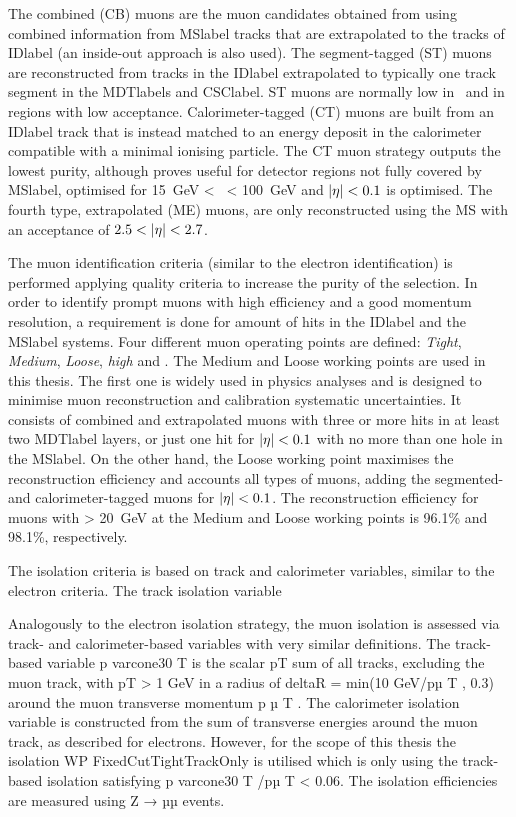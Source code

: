The combined (CB) muons are the muon candidates obtained from using combined information from \acrshort{MSlabel} tracks that are extrapolated to the tracks of \acrshort{IDlabel} (an inside-out approach is also used). The segment-tagged (ST) muons are reconstructed from tracks in the \acrshort{IDlabel} extrapolated to typically one track segment in the \acrshort{MDTlabel}s and \acrshort{CSClabel}. ST muons are normally low in \pT\ and in regions with low acceptance. Calorimeter-tagged (CT) muons are built from an \acrshort{IDlabel} track that is instead matched to an energy deposit in the calorimeter compatible with a minimal ionising particle. The CT muon strategy outputs the lowest purity, although proves useful for detector regions not fully covered by \acrshort{MSlabel}, optimised for 15~GeV < \pT\ < 100~GeV and $\abs{\eta}<0.1$ is optimised. The fourth type, extrapolated (ME) muons, are only reconstructed using the \acrshort{MS} with an acceptance of $2.5 < \abs{\eta} < 2.7$.

The muon identification criteria (similar to the electron identification) is performed applying quality criteria to increase the purity of the selection. In order to identify prompt muons with high efficiency and a
good momentum resolution, a requirement is done for amount of hits in the \acrshort{IDlabel} and the \acrshort{MSlabel} systems. Four different muon operating points are defined: \textit{Tight}, \textit{Medium}, \textit{Loose}, \textit{high \pT} and . The Medium and Loose working points are used in this thesis. The first one is widely used in physics analyses and is designed to minimise muon reconstruction and calibration systematic uncertainties. It consists of combined and extrapolated muons with three or more hits in at least two \acrshort{MDTlabel} layers, or just one hit for $\abs{\eta}<0.1$ with no more than one hole in the \acrshort{MSlabel}. On the other hand, the Loose working point maximises the reconstruction efficiency and accounts all types of muons, adding the segmented- and calorimeter-tagged muons for $\abs{\eta}<0.1$. The reconstruction efficiency for muons with \pT > 20~GeV at the Medium and Loose working points is 96.1\% and 98.1\%, respectively.

The isolation criteria is based on track and calorimeter variables, similar to the electron criteria. The track isolation variable

Analogously to the electron isolation strategy, the muon isolation is assessed via track- and calorimeter-based variables with very similar definitions. The track-based variable p
varcone30
T
is the scalar pT sum
of all tracks, excluding the muon track, with pT > 1 GeV in a radius of deltaR = min(10 GeV/pµ
T
, 0.3)
around the muon transverse momentum p
µ
T
. The calorimeter isolation variable is constructed from
the sum of transverse energies around the muon track, as described for electrons. However, for the
scope of this thesis the isolation WP FixedCutTightTrackOnly is utilised which is only using the
track-based isolation satisfying p
varcone30
T
/pµ
T < 0.06. The isolation efficiencies are measured using
Z → µµ events.

